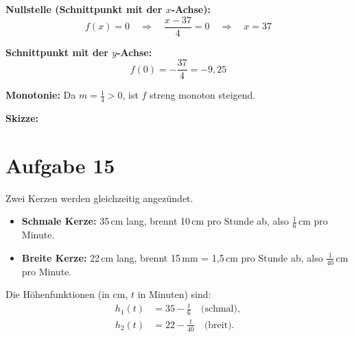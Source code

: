 \documentclass[12pt]{article}
\begin{document}
\textbf{Nullstelle (Schnittpunkt mit der $x$-Achse):}
\[
  f(x) = 0 \quad\Longrightarrow\quad \frac{x-37}{4} = 0 \quad\Longrightarrow\quad x = 37
\]

\textbf{Schnittpunkt mit der $y$-Achse:}
\[
  f(0) = -\frac{37}{4} = -9{,}25
\]

\textbf{Monotonie:} Da $m = \tfrac{1}{4} > 0$, ist $f$ streng monoton steigend.

\textbf{Skizze:}

\begin{center}
\end{center}


\section*{Aufgabe 15}

Zwei Kerzen werden gleichzeitig angez\"undet.

\begin{itemize}
  \item \textbf{Schmale Kerze:} 35\,cm lang, brennt 10\,cm pro Stunde ab, also $\tfrac{1}{6}$\,cm pro Minute.
  \item \textbf{Breite Kerze:} 22\,cm lang, brennt 15\,mm = 1{,}5\,cm pro Stunde ab, also $\tfrac{1}{40}$\,cm pro Minute.
\end{itemize}

Die H\"ohenfunktionen (in cm, $t$ in Minuten) sind:
\begin{align*}
  h_1(t) &= 35 - \frac{t}{6} \quad \text{(schmal)}, \\
  h_2(t) &= 22 - \frac{t}{40} \quad \text{(breit)}.
\end{align*}
\end{document}
